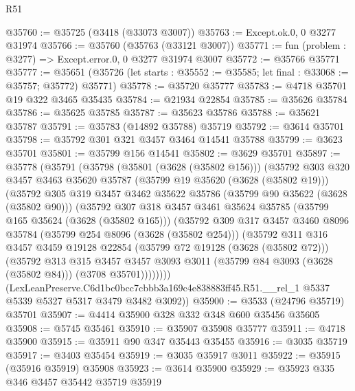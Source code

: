 \begin{lexlean}{R51}
\begin{coremodule}
@35760 := @35725 (@3418 (@33073 @3007))
@35763 := Except.ok.{0, 0} @3277 @31974
@35766 := @35760 (@35763 (@33121 @3007))
@35771 := fun (problem : @3277) => Except.error.{0, 0} @3277 @31974 @3007
@35772 := @35766 @35771
@35777 := @35651
    (@35726 (let starts : @35552 := @35585; let final : @33068 := @35757; @35772) @35771)
@35778 := @35720 @35777
@35783 := @4718 @35701 @19 @322 @3465 @35435
@35784 := @21934 @22854
@35785 := @35626 @35784
@35786 := @35625 @35785
@35787 := @35623 @35786
@35788 := @35621 @35787
@35791 := @35783 (@14892 @35788) @35719
@35792 := @3614 @35701
@35798 := @35792 @301 @321 @3457 @3464 @14541 @35788
@35799 := @3623 @35701
@35801 := @35799 @156 @14541
@35802 := @3629 @35701
@35897 := @35778
    (@35791
      (@35798
        (@35801 (@3628 (@35802 @156)))
        (@35792
          @303
          @320
          @3457
          @3463
          @35620
          @35787
          (@35799 @19 @35620 (@3628 (@35802 @19)))
          (@35792
            @305
            @319
            @3457
            @3462
            @35622
            @35786
            (@35799 @90 @35622 (@3628 (@35802 @90)))
            (@35792
              @307
              @318
              @3457
              @3461
              @35624
              @35785
              (@35799 @165 @35624 (@3628 (@35802 @165)))
              (@35792
                @309
                @317
                @3457
                @3460
                @8096
                @35784
                (@35799 @254 @8096 (@3628 (@35802 @254)))
                (@35792
                  @311
                  @316
                  @3457
                  @3459
                  @19128
                  @22854
                  (@35799 @72 @19128 (@3628 (@35802 @72)))
                  (@35792
                    @313
                    @315
                    @3457
                    @3457
                    @3093
                    @3011
                    (@35799 @84 @3093 (@3628 (@35802 @84)))
                    (@3708 @35701))))))))
      (LexLeanPreserve.C6d1bc0bcc7cbbb3a169c4e838883ff45.R51.__rel_1
        @5337
        @5339
        @5327
        @5317
        @3479
        @3482
        @3092))
@35900 := @3533 (@24796 @35719) @35701
@35907 := @4414 @35900 @328 @332 @348 @600 @35456 @35605
@35908 := @5745 @35461
@35910 := @35907 @35908 @35777
@35911 := @4718 @35900
@35915 := @35911 @90 @347 @35443 @35455
@35916 := @3035 @35719
@35917 := @3403 @35454
@35919 := @3035 @35917 @3011
@35922 := @35915 (@35916 @35919) @35908
@35923 := @3614 @35900
@35929 := @35923 @335 @346 @3457 @35442 @35719 @35919

\end{coremodule}
\end{lexlean}
